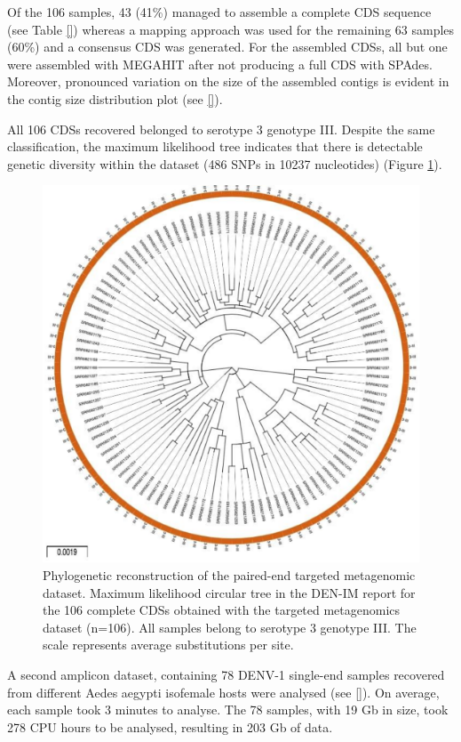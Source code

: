 Of the 106 samples, 43 (41\%) managed to assemble a complete CDS sequence (see Table \ref{}) whereas a mapping approach was used for the remaining 63 samples (60\%) and a consensus CDS was generated. For the assembled CDSs, all but one were assembled with MEGAHIT after not producing a full CDS with SPAdes. Moreover, pronounced variation on the size of the assembled contigs is evident in the contig size distribution plot (see \ref{}).

All 106 CDSs recovered belonged to serotype 3 genotype III. Despite the same classification, the maximum likelihood tree indicates that there is detectable genetic diversity within the dataset (486 SNPs in 10237 nucleotides) (Figure \ref{fig:chap4_figure3}).

\begin{figure}[h!]
\centering
\includegraphics[width=\textwidth]{figures/chapter 4/Figure3_phylo_tree_amplicon.pdf}
\caption{Phylogenetic reconstruction of the paired-end targeted metagenomic dataset. Maximum likelihood circular tree in the DEN-IM report for the 106 complete CDSs obtained with the targeted metagenomics dataset (n=106). All samples belong to serotype 3 genotype III. The scale represents average substitutions per site.}
\label{fig:chap4_figure3}
\end{figure}

A second amplicon dataset, containing 78 DENV-1 single-end samples recovered from different Aedes aegypti isofemale hosts were analysed (see \ref{}). On average, each sample took 3 minutes to analyse. The 78 samples, with 19 Gb in size, took 278 CPU hours to be analysed, resulting in 203 Gb of data.

